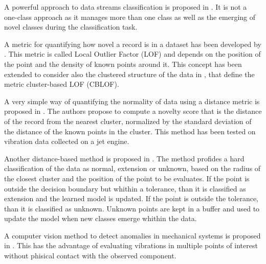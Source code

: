 A powerful approach to data streams classification is proposed in \cite{Masud2011}. It is not a one-class approach as it manages more than one  class as well as the emerging of novel classes during the classification task. 

A metric for quantifying how novel a record is in a dataset has been developed by \cite{Breunig00}. This metric is called Local Outlier Factor (LOF) and depends on the position of the point and the density of known points around it. This concept has been extended to consider also the clustered structure of the data in \cite{HE2003}, that define the metric cluster-based LOF (CBLOF).

A very simple way of quantifying the normality of data using a distance metric is proposed in \cite{Clifton06}. The authors propose to compute a novelty score that is the distance of the record from the nearest cluster, normalized by the standard deviation of the distance of the known points in the cluster. This method has been tested on vibration data collected on a jet engine.

Another distance-based method  is proposed in \cite{Garcia19}. The method profides a hard classification of the data as normal, extension or unknown, based on the radius of the closest cluster and the position of the point to be evaluates. If the point is outside the decision boundary but whithin a tolerance, than it is classified as extension and the learned model is updated. If the point is outside the tolerance, than it is classified as unknown. Unknown points are kept in a buffer and used to update the model when new classes emerge whithin the data.


A  computer vision method to detect anomalies in mechanical systems is proposed in \cite{SPYTEK2023109823}. This has the advantage of evaluating vibrations in multiple points of interest without phisical contact with the observed component.